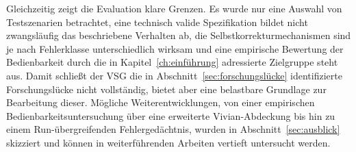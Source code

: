 Gleichzeitig zeigt die Evaluation klare Grenzen. Es wurde nur eine Auswahl von Testszenarien betrachtet, eine technisch valide Spezifikation bildet nicht zwangsläufig das beschriebene Verhalten ab, die Selbstkorrekturmechanismen sind je nach Fehlerklasse unterschiedlich wirksam und eine empirische Bewertung der Bedienbarkeit durch die in Kapitel~\ref{ch:einführung} adressierte Zielgruppe steht aus. Damit schließt der VSG die in Abschnitt~\ref{sec:forschungslücke} identifizierte Forschungslücke nicht vollständig, bietet aber eine belastbare Grundlage zur Bearbeitung dieser. Mögliche Weiterentwicklungen, von einer empirischen Bedienbarkeitsuntersuchung über eine erweiterte Vivian-Abdeckung bis hin zu einem Run-übergreifenden Fehlergedächtnis, wurden in Abschnitt~\ref{sec:ausblick} skizziert und können in weiterführenden Arbeiten vertieft untersucht werden.


